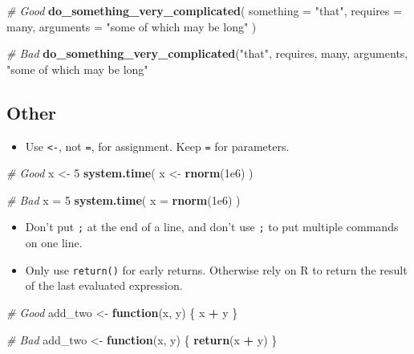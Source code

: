 \documentclass[]{book}
\newenvironment{Shaded}{\begin{snugshade}}{\end{snugshade}}
\newcommand{\KeywordTok}[1]{\textcolor[rgb]{0.13,0.29,0.53}{\textbf{#1}}}
\newcommand{\DataTypeTok}[1]{\textcolor[rgb]{0.13,0.29,0.53}{#1}}
\newcommand{\DecValTok}[1]{\textcolor[rgb]{0.00,0.00,0.81}{#1}}
\newcommand{\FloatTok}[1]{\textcolor[rgb]{0.00,0.00,0.81}{#1}}
\newcommand{\StringTok}[1]{\textcolor[rgb]{0.31,0.60,0.02}{#1}}
\newcommand{\CommentTok}[1]{\textcolor[rgb]{0.56,0.35,0.01}{\textit{#1}}}
\newcommand{\ControlFlowTok}[1]{\textcolor[rgb]{0.13,0.29,0.53}{\textbf{#1}}}
\newcommand{\OperatorTok}[1]{\textcolor[rgb]{0.81,0.36,0.00}{\textbf{#1}}}
\newcommand{\NormalTok}[1]{#1}
\providecommand{\tightlist}{%
  \setlength{\itemsep}{0pt}\setlength{\parskip}{0pt}}
\theoremstyle{definition}
\theoremstyle{definition}
\theoremstyle{definition}
\theoremstyle{remark}
\begin{document}
\begin{Shaded}
\begin{Highlighting}[]
\CommentTok{# Good}
\KeywordTok{do_something_very_complicated}\NormalTok{(}
  \DataTypeTok{something =} \StringTok{"that"}\NormalTok{,}
  \DataTypeTok{requires  =}\NormalTok{ many,}
  \DataTypeTok{arguments =} \StringTok{"some of which may be long"}
\NormalTok{)}

\CommentTok{# Bad}
\KeywordTok{do_something_very_complicated}\NormalTok{(}\StringTok{"that"}\NormalTok{, requires, many, arguments,}
                              \StringTok{"some of which may be long"}
\end{Highlighting}
\end{Shaded}

\subsection{Other}\label{other}

\begin{itemize}
\tightlist
\item
  Use \texttt{\textless{}-}, not \texttt{=}, for assignment. Keep
  \texttt{=} for parameters.
\end{itemize}

\begin{Shaded}
\begin{Highlighting}[]
\CommentTok{# Good}
\NormalTok{x <-}\StringTok{ }\DecValTok{5}
\KeywordTok{system.time}\NormalTok{(}
\NormalTok{  x <-}\StringTok{ }\KeywordTok{rnorm}\NormalTok{(}\FloatTok{1e6}\NormalTok{)}
\NormalTok{)}

\CommentTok{# Bad}
\NormalTok{x =}\StringTok{ }\DecValTok{5}
\KeywordTok{system.time}\NormalTok{(}
  \DataTypeTok{x =} \KeywordTok{rnorm}\NormalTok{(}\FloatTok{1e6}\NormalTok{)}
\NormalTok{)}
\end{Highlighting}
\end{Shaded}

\begin{itemize}
\item
  Don't put \texttt{;} at the end of a line, and don't use \texttt{;} to
  put multiple commands on one line.
\item
  Only use \texttt{return()} for early returns. Otherwise rely on R to
  return the result of the last evaluated expression.
\end{itemize}

\begin{Shaded}
\begin{Highlighting}[]
\CommentTok{# Good}
\NormalTok{add_two <-}\StringTok{ }\ControlFlowTok{function}\NormalTok{(x, y) \{}
\NormalTok{  x }\OperatorTok{+}\StringTok{ }\NormalTok{y}
\NormalTok{\}}

\CommentTok{# Bad}
\NormalTok{add_two <-}\StringTok{ }\ControlFlowTok{function}\NormalTok{(x, y) \{}
  \KeywordTok{return}\NormalTok{(x }\OperatorTok{+}\StringTok{ }\NormalTok{y)}
\NormalTok{\}}
\end{Highlighting}
\end{Shaded}
\end{document}
